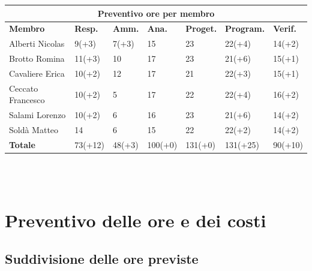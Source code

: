 \documentclass[a4paper, 12pt]{article}
\begin{document}
\begin{center}
	\begin{tabularx}{\textwidth}{|X|X|X|X|X|X|X|}
		\hline
		\multicolumn{7}{|c|}{\textbf{Preventivo ore per membro}}                                            \\
		\hline
		\hline
		\textbf{Membro}   & \textbf{Resp.}    & \textbf{Amm.}   & \textbf{Ana.} &
		\textbf{Proget.}  & \textbf{Program.} & \textbf{Verif.}                                             \\
		\hline
		Alberti Nicolas   & 9(+3)                 & 7(+3)               & 15            & 23  		 & 22(+4) 		 	& 14(+2)      \\
		\hline
		Brotto Romina     & 11(+3)                & 10              	& 17       		& 23    	 & 21(+6)       	& 15(+1) 	\\
		\hline
		Cavaliere Erica   & 10(+2)                & 12             		& 17        	& 21 		 & 22(+3)	 	 	& 15(+1)     \\
		\hline
		Ceccato Francesco & 10(+2)             	  & 5            		& 17            & 22 		 & 22(+4) 			& 16(+2)     \\
		\hline
		Salami Lorenzo    & 10(+2)                & 6              		& 16     		& 23 		 & 21(+6)    	 	& 14(+2)	\\
		\hline
		Soldà Matteo      & 14                    & 6          			& 15            & 22    	 & 22(+2) 			& 14(+2)  	\\
		\hline
		\hline
		\textbf{Totale}   & 73(+12)            & 48(+3)          & 100(+0)        & 131(+0)		 & 131(+25) & 90(+10) \\
		\hline
	\end{tabularx}\\[8pt]
	\mbox{}\\
\end{center}

\newpage

\section{Preventivo delle ore e dei costi}

\subsection{Suddivisione delle ore previste}
\end{document}

